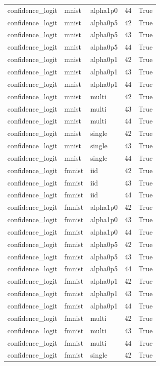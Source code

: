\begin{tabular}{lllrr}
confidence\_logit & mnist & alpha1p0 & 44 & True \\
confidence\_logit & mnist & alpha0p5 & 42 & True \\
confidence\_logit & mnist & alpha0p5 & 43 & True \\
confidence\_logit & mnist & alpha0p5 & 44 & True \\
confidence\_logit & mnist & alpha0p1 & 42 & True \\
confidence\_logit & mnist & alpha0p1 & 43 & True \\
confidence\_logit & mnist & alpha0p1 & 44 & True \\
confidence\_logit & mnist & multi & 42 & True \\
confidence\_logit & mnist & multi & 43 & True \\
confidence\_logit & mnist & multi & 44 & True \\
confidence\_logit & mnist & single & 42 & True \\
confidence\_logit & mnist & single & 43 & True \\
confidence\_logit & mnist & single & 44 & True \\
confidence\_logit & fmnist & iid & 42 & True \\
confidence\_logit & fmnist & iid & 43 & True \\
confidence\_logit & fmnist & iid & 44 & True \\
confidence\_logit & fmnist & alpha1p0 & 42 & True \\
confidence\_logit & fmnist & alpha1p0 & 43 & True \\
confidence\_logit & fmnist & alpha1p0 & 44 & True \\
confidence\_logit & fmnist & alpha0p5 & 42 & True \\
confidence\_logit & fmnist & alpha0p5 & 43 & True \\
confidence\_logit & fmnist & alpha0p5 & 44 & True \\
confidence\_logit & fmnist & alpha0p1 & 42 & True \\
confidence\_logit & fmnist & alpha0p1 & 43 & True \\
confidence\_logit & fmnist & alpha0p1 & 44 & True \\
confidence\_logit & fmnist & multi & 42 & True \\
confidence\_logit & fmnist & multi & 43 & True \\
confidence\_logit & fmnist & multi & 44 & True \\
confidence\_logit & fmnist & single & 42 & True \\

\end{tabular}
